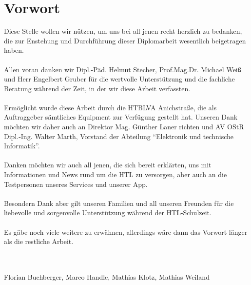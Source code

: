 \chapter{Vorwort}


Diese Stelle wollen wir nützen, um uns bei all jenen recht herzlich zu bedanken, die zur Enstehung und Durchführung dieser Diplomarbeit wesentlich beigetragen haben.\\
\\
Allen voran danken wir Dipl.-Päd. Helmut Stecher, Prof.Mag.Dr. Michael Weiß und Herr Engelbert Gruber für die wertvolle Unterstützung und die fachliche Beratung während der Zeit, in der wir diese Arbeit verfassten.\\
\\
Ermöglicht wurde diese Arbeit durch die HTBLVA Anichstraße, die als Auftraggeber sämtliches Equipment zur Verfügung gestellt hat. Unseren Dank möchten wir daher auch an Direktor Mag. Günther Laner richten und AV OStR Dipl.-Ing. Walter Marth, Vorstand der Abteilung \enquote{Elektronik und technische Informatik}.\\
\\
Danken möchten wir auch all jenen, die sich bereit erklärten, uns mit Informationen und News rund um die HTL zu versorgen, aber auch an die Testpersonen unseres Services und unserer App.\\
\\
Besondern Dank aber gilt unseren Familien und all unseren Freunden für die liebevolle und sorgenvolle Unterstützung während der HTL-Schulzeit.\\
\\
Es gäbe noch viele weitere zu erwähnen, allerdings wäre dann das Vorwort länger als die restliche Arbeit.\\
\\
\\
\begin{flushright}
Florian Buchberger, Marco Handle, Mathias Klotz, Mathias Weiland
\end{flushright}